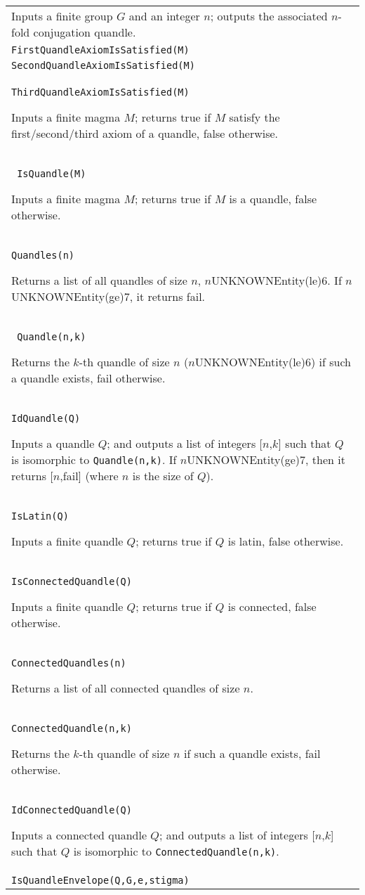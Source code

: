 \documentclass[a4paper,11pt]{report}
\begin{document}
{\begin{center}
\begin{tabular}{|l|}
 Inputs a finite group $G$ and an integer $n$; outputs the associated $n$-fold conjugation quandle. \\
 \index{QuandleAxiomIsSatisfied} \texttt{FirstQuandleAxiomIsSatisfied(M) } \\
 \texttt{SecondQuandleAxiomIsSatisfied(M) } \\
 \texttt{ThirdQuandleAxiomIsSatisfied(M) } 

 Inputs a finite magma $M$; returns true if $M$ satisfy the first/second/third axiom of a quandle, false otherwise. \\
 \index{IsQuandle} \texttt{ IsQuandle(M) } 

 Inputs a finite magma $M$; returns true if $M$ is a quandle, false otherwise. \\
 \index{Quandles} \texttt{Quandles(n) } 

 Returns a list of all quandles of size $n$, $n$UNKNOWNEntity(le)$6$. If $n$UNKNOWNEntity(ge)$7$, it returns fail. \\
 \index{Quandle} \texttt{ Quandle(n,k) } 

 Returns the $k$-th quandle of size $n$ ($n$UNKNOWNEntity(le)$6$) if such a quandle exists, fail otherwise. \\
 \index{IdQuandle} \texttt{IdQuandle(Q) } 

 Inputs a quandle $Q$; and outputs a list of integers [$n$,$k$] such that $Q$ is isomorphic to \texttt{Quandle(n,k)}. If $n$UNKNOWNEntity(ge)$7$, then it returns [$n$,fail] (where $n$ is the size of $Q$). \\
 \index{IsLatin} \texttt{IsLatin(Q) } 

 Inputs a finite quandle $Q$; returns true if $Q$ is latin, false otherwise. \\
 \index{IsConnectedQuandle} \texttt{IsConnectedQuandle(Q) } 

 Inputs a finite quandle $Q$; returns true if $Q$ is connected, false otherwise. \\
 \index{ConnectedQuandles} \texttt{ConnectedQuandles(n) } 

 Returns a list of all connected quandles of size $n$. \\
 \index{ConnectedQuandle} \texttt{ConnectedQuandle(n,k) } 

 Returns the $k$-th quandle of size $n$ if such a quandle exists, fail otherwise. \\
 \index{IdConnectedQuandle} \texttt{IdConnectedQuandle(Q) } 

 Inputs a connected quandle $Q$; and outputs a list of integers [$n$,$k$] such that $Q$ is isomorphic to \texttt{ConnectedQuandle(n,k)}. \\
 \index{IsQuandleEnvelope} \texttt{IsQuandleEnvelope(Q,G,e,stigma) } 


\end{tabular}
\end{center}}
\end{document}
